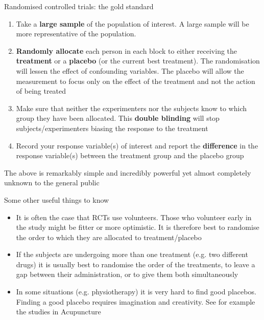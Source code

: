 \documentclass[12pt,xcolor=dvipsnames,handout,mathserif,aspectratio=169]{beamer}
\newcommand{\bbl}[1]{{\color{NavyBlue} \textbf{#1}}}
\begin{document}
\begin{frame}{ Randomised controlled trials: the gold standard }

\begin{enumerate}
\item Take a \bbl{large sample} of the population of interest. A large sample will be more representative of the population.
\pause
\item \bbl{Randomly allocate} each person in each block to either receiving the \bbl{treatment} or a \bbl{placebo} (or the current best treatment). The randomisation will lessen the effect of confounding variables. The placebo will allow the measurement to focus only on the effect of the treatment and not the action of being treated
\pause
\item Make sure that neither the experimenters nor the subjects know to which group they have been allocated. This \bbl{double blinding} will stop subjects/experimenters biasing the response to the treatment
\pause
\item Record your response variable(s) of interest and report the \bbl{difference} in the response variable(s) between the treatment group and the placebo group
\end{enumerate}
\pause
The above is remarkably simple and incredibly powerful yet almost completely unknown to the general public
\end{frame}


\begin{frame}{ Some other useful things to know }

\begin{itemize}
\item It is often the case that RCTs use volunteers. Those who volunteer early in the study might be fitter or more optimistic. It is therefore best to randomise the order to which they are allocated to treatment/placebo
\pause
\item If the subjects are undergoing more than one treatment (e.g. two different drugs) it is usually best to randomise the order of the treatments, to leave a gap between their administration, or to give them both simultaneously
\pause
\item In some situations (e.g. physiotherapy) it is very hard to find good placebos. Finding a good placebo requires imagination and creativity. See for example the studies in Acupuncture
\end{itemize}

\end{frame}
\end{document}
